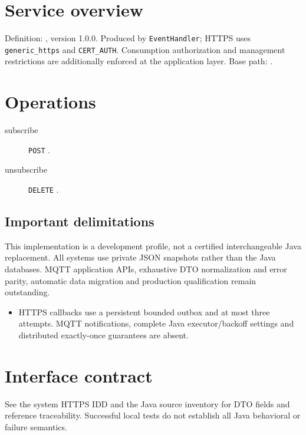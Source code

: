 \documentclass[a4paper]{arrowhead}
\begin{document}
\ArrowheadSetup
\section{Service overview}
Definition: , version 1.0.0. Produced by \texttt{EventHandler}; HTTPS uses \texttt{generic\_https} and \texttt{CERT\_AUTH}. Consumption authorization and management restrictions are additionally enforced at the application layer. Base path: .
\section{Operations}
\begin{description}
\item[subscribe] \texttt{POST} .
\item[unsubscribe] \texttt{DELETE} .
\end{description}
\subsection{Important delimitations}
This implementation is a development profile, not a certified interchangeable Java replacement. All systems use private JSON snapshots rather than the Java databases. MQTT application APIs, exhaustive DTO normalization and error parity, automatic data migration and production qualification remain outstanding.
\begin{itemize}
\item HTTPS callbacks use a persistent bounded outbox and at most three attempts. MQTT notifications, complete Java executor/backoff settings and distributed exactly-once guarantees are absent.
\end{itemize}
\section{Interface contract}
See the system HTTPS IDD and the Java source inventory for DTO fields and reference traceability. Successful local tests do not establish all Java behavioral or failure semantics.
\end{document}
